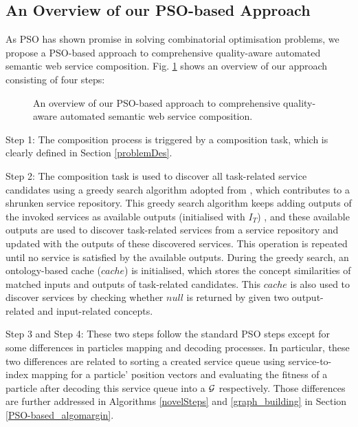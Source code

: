 \subsection{An Overview of our PSO-based Approach}\label{PSO_based_approach}
As PSO has shown promise in solving combinatorial optimisation problems, we propose a PSO-based approach to comprehensive quality-aware automated semantic web service composition. Fig. \ref{overview} shows an overview of our approach consisting of four steps: 
\begin{figure}[h]
\centering
{}
 \caption{An overview of our PSO-based approach to comprehensive quality-aware automated semantic web service composition.}
 \label{overview}
\end{figure}

Step 1: The composition process is triggered by a composition task, which is clearly defined in Section \ref{problemDes}. 

Step 2: The composition task is used to discover all task-related service candidates using a greedy search algorithm adopted from \cite{ma2015hybrid}, which contributes to a shrunken service repository. This greedy search algorithm keeps adding outputs of the invoked services as available outputs (initialised with $I_{T}$) , and these available outputs are used to discover task-related services from a service repository and updated with the outputs of these discovered services. This operation is repeated until no service is satisfied by the available outputs. During the greedy search, an ontology-based cache ($cache$) is initialised, which stores the concept similarities of matched inputs and outputs of task-related candidates. This $cache$ is also used to discover services by checking whether $null$ is returned by given two output-related and input-related concepts.

Step 3 and Step 4: These two steps follow the standard PSO steps \cite{shi2001particle} except for some differences in particles mapping and decoding processes. In particular, these two differences are related to sorting a created service queue using service-to-index mapping for a particle' position vectors and evaluating the fitness of a particle after decoding this service queue into a $\mathcal{G}$ respectively. Those differences are further addressed in Algorithms \ref{novelSteps} and \ref{graph_building} in Section \ref{PSO-based_algomargin}.
